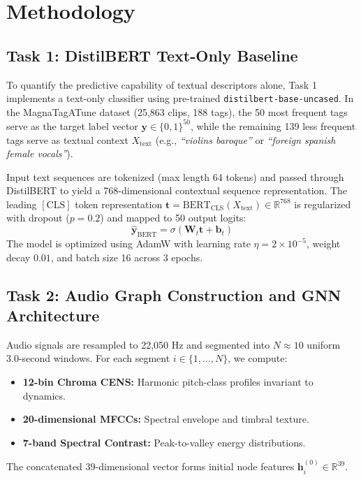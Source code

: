\documentclass{article}
\begin{document}
\section{Methodology}

\subsection{Task 1: DistilBERT Text-Only Baseline}
To quantify the predictive capability of textual descriptors alone, Task 1 implements a text-only classifier using pre-trained \texttt{distilbert-base-uncased}. In the MagnaTagATune dataset (25,863 clips, 188 tags), the 50 most frequent tags serve as the target label vector $\mathbf{y} \in \{0, 1\}^{50}$, while the remaining 139 less frequent tags serve as textual context $X_{\text{text}}$ (e.g., \textit{``violins baroque''} or \textit{``foreign spanish female vocals''}).

Input text sequences are tokenized (max length 64 tokens) and passed through DistilBERT to yield a 768-dimensional contextual sequence representation. The leading $[\text{CLS}]$ token representation $\mathbf{t} = \text{BERT}_{\text{CLS}}(X_{\text{text}}) \in \mathbb{R}^{768}$ is regularized with dropout ($p = 0.2$) and mapped to 50 output logits:
\begin{equation}
    \hat{\mathbf{y}}_{\text{BERT}} = \sigma(\mathbf{W}_t \mathbf{t} + \mathbf{b}_t)
\end{equation}
The model is optimized using AdamW with learning rate $\eta = 2 \times 10^{-5}$, weight decay $0.01$, and batch size 16 across 3 epochs.

\subsection{Task 2: Audio Graph Construction and GNN Architecture}
Audio signals are resampled to 22,050 Hz and segmented into $N \approx 10$ uniform 3.0-second windows. For each segment $i \in \{1, \dots, N\}$, we compute:
\begin{itemize}
    \item \textbf{12-bin Chroma CENS:} Harmonic pitch-class profiles invariant to dynamics.
    \item \textbf{20-dimensional MFCCs:} Spectral envelope and timbral texture.
    \item \textbf{7-band Spectral Contrast:} Peak-to-valley energy distributions.
\end{itemize}
The concatenated 39-dimensional vector forms initial node features $\mathbf{h}_i^{(0)} \in \mathbb{R}^{39}$. 
\end{document}
